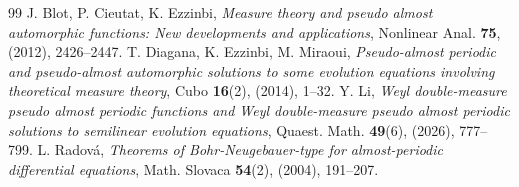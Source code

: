 \documentclass[10pt,a4paper]{amsart}
\begin{document}
\begin{thebibliography}{99}
 J. Blot, P. Cieutat, K. Ezzinbi, \emph{Measure theory and pseudo almost automorphic functions: New developments and applications}, Nonlinear Anal. \textbf{75}, (2012), 2426--2447.
 T. Diagana, K. Ezzinbi, M. Miraoui, \emph{Pseudo-almost periodic and pseudo-almost automorphic solutions to some evolution equations involving theoretical measure theory}, Cubo \textbf{16}(2), (2014), 1--32.
 Y. Li, \emph{Weyl double-measure pseudo almost periodic functions and Weyl double-measure pseudo almost periodic solutions to semilinear evolution equations}, Quaest. Math. \textbf{49}(6), (2026), 777--799.
 L. Radov\'a, \emph{Theorems of Bohr-Neugebauer-type for almost-periodic differential equations}, Math. Slovaca \textbf{54}(2), (2004), 191--207.
\end{thebibliography}
\end{document}
